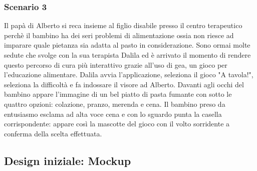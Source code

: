 \subsubsection{Scenario 3}
Il papà di Alberto si reca insieme al figlio disabile presso il centro terapeutico perchè il bambino ha dei seri problemi di alimentazione ossia non riesce ad imparare quale pietanza sia adatta al pasto in considerazione. Sono ormai molte sedute che svolge con la sua terapista Dalila ed è arrivato il momento di rendere questo percorso di cura più interattivo grazie all'uso di \acs{gea}, un gioco per l'educazione alimentare. Dalila avvia l'applicazione, seleziona il gioco "A tavola!", seleziona la difficoltà e fa indossare il visore ad Alberto. Davanti agli occhi del bambino appare l'immagine di un bel piatto di pasta fumante con sotto le quattro opzioni: colazione, pranzo, merenda e cena. Il bambino preso da entusiasmo esclama ad alta voce cena e con lo sguardo punta la casella corrispondente: appare così la mascotte del gioco con il volto sorridente a conferma della scelta effettuata.
\clearpage

\subsection{Design iniziale: Mockup}

